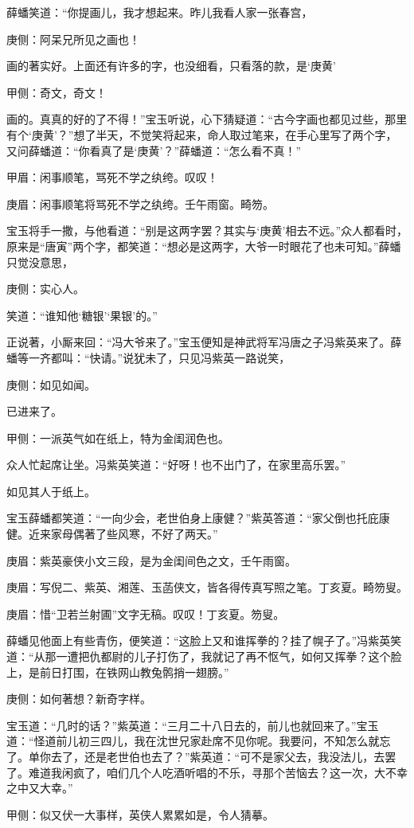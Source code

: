 \begin{parag}
    薛蟠笑道：“你提画儿，我才想起来。昨儿我看人家一张春宫，\begin{note}庚侧：阿呆兄所见之画也！\end{note}画的著实好。上面还有许多的字，也没细看，只看落的款，是‘庚黄’\begin{note}甲侧：奇文，奇文！\end{note}画的。真真的好的了不得！”宝玉听说，心下猜疑道：“古今字画也都见过些，那里有个‘庚黄’？”想了半天，不觉笑将起来，命人取过笔来，在手心里写了两个字，又问薛蟠道：“你看真了是‘庚黄’？”薛蟠道：“怎么看不真！”\begin{note}甲眉：闲事顺笔，骂死不学之纨绔。叹叹！\end{note}\begin{note}庚眉：闲事顺笔将骂死不学之纨绔。壬午雨窗。畸笏。\end{note}宝玉将手一撒，与他看道：“别是这两字罢？其实与‘庚黄’相去不远。”众人都看时，原来是“唐寅”两个字，都笑道：“想必是这两字，大爷一时眼花了也未可知。”薛蟠只觉没意思，\begin{note}庚侧：实心人。\end{note}笑道：“谁知他‘糖银’‘果银’的。”
\end{parag}


\begin{parag}
    正说著，小厮来回：“冯大爷来了。”宝玉便知是神武将军冯唐之子冯紫英来了。薛蟠等一齐都叫：“快请。”说犹未了，只见冯紫英一路说笑，\begin{note}庚侧：如见如闻。\end{note}已进来了。\begin{note}甲侧：一派英气如在纸上，特为金闺润色也。\end{note}众人忙起席让坐。冯紫英笑道：“好呀！也不出门了，在家里高乐罢。”\begin{note}如见其人于纸上。\end{note}宝玉薛蟠都笑道：“一向少会，老世伯身上康健？”紫英答道：“家父倒也托庇康健。近来家母偶著了些风寒，不好了两天。”\begin{note}庚眉：紫英豪侠小文三段，是为金闺间色之文，壬午雨窗。\end{note}\begin{note}庚眉：写倪二、紫英、湘莲、玉菡侠文，皆各得传真写照之笔。丁亥夏。畸笏叟。\end{note}\begin{note}庚眉：惜“卫若兰射圃”文字无稿。叹叹！丁亥夏。笏叟。\end{note}薛蟠见他面上有些青伤，便笑道：“这脸上又和谁挥拳的？挂了幌子了。”冯紫英笑道：“从那一遭把仇都尉的儿子打伤了，我就记了再不怄气，如何又挥拳？这个脸上，是前日打围，在铁网山教兔鹘捎一翅膀。”\begin{note}庚侧：如何著想？新奇字样。\end{note}宝玉道：“几时的话？”紫英道：“三月二十八日去的，前儿也就回来了。”宝玉道：“怪道前儿初三四儿，我在沈世兄家赴席不见你呢。我要问，不知怎么就忘了。单你去了，还是老世伯也去了？”紫英道：“可不是家父去，我没法儿，去罢了。难道我闲疯了，咱们几个人吃酒听唱的不乐，寻那个苦恼去？这一次，大不幸之中又大幸。”\begin{note}甲侧：似又伏一大事样，英侠人累累如是，令人猜摹。\end{note}
\end{parag}


